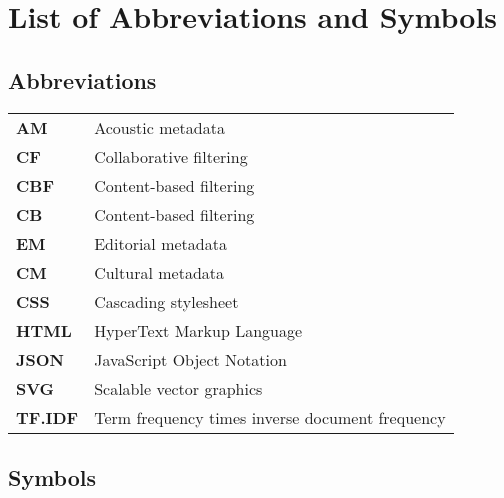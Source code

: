 \chapter*{List of Abbreviations and Symbols}\label{chapter:abbreviations}

\section*{Abbreviations}
\begin{flushleft}
  \renewcommand{\arraystretch}{1.1}
  \begin{tabularx}{\textwidth}{@{}p{12mm}X@{}}
    \textbf{AM}					&	Acoustic metadata																\\
		\textbf{CF}					& Collaborative filtering													\\
		\textbf{CBF}				& Content-based filtering													\\
		\textbf{CB}					& Content-based filtering													\\
		\textbf{EM}					&	Editorial metadata															\\
		\textbf{CM}					&	Cultural metadata																\\
		\textbf{CSS}				& Cascading stylesheet														\\
		\textbf{HTML}				& HyperText Markup Language 											\\
		\textbf{JSON}				& JavaScript Object Notation											\\
		\textbf{SVG} 				& Scalable vector graphics 												\\
		\textbf{TF.IDF}			&	Term frequency times inverse document frequency	\\
  \end{tabularx}
\end{flushleft}

\section*{Symbols}
\begin{flushleft}
  \renewcommand{\arraystretch}{1.1}
  \begin{tabularx}{\textwidth}{@{}p{12mm}X@{}}
  \end{tabularx}
\end{flushleft}
